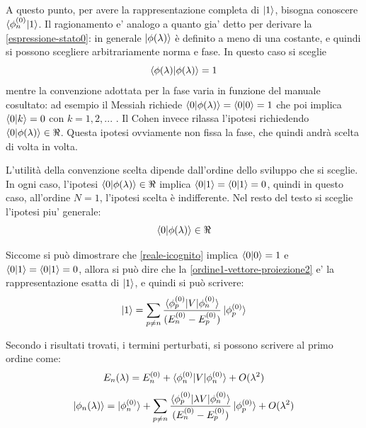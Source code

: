 \documentclass[a4paper, 10pt]{article}
\newcommand{\reff}[1]{\mbox{\ref{#1}}}
\begin{document}
A questo punto, per avere la rappresentazione completa di $\ket{1}$, bisogna conoscere $\braket{\phi_n^{(0)} | 1}$. Il ragionamento e' analogo a quanto gia' detto per derivare la \reff{espressione-stato0}: in generale $\ket{\phi(\lambda)}$ è definito a meno di una costante, e quindi si possono scegliere arbitrariamente norma e fase. In questo caso si sceglie
\begin{equation}
	\label{normalizzazione-incognito}
	\braket{\phi(\lambda) | \phi(\lambda)} = 1
\end{equation}
mentre la convenzione adottata per la fase varia in funzione del manuale cosultato: ad esempio il Messiah\cite{messiah} richiede $\braket{0 | \phi(\lambda)} = \braket{0 | 0} = 1$ che poi implica $\braket{0 | k} = 0$ con $k = 1, 2, ...$ . Il Cohen\cite{cohen} invece rilassa l'ipotesi richiedendo $\braket{0 | \phi(\lambda)} \in \Re$. Questa ipotesi ovviamente non fissa la fase, che quindi andrà scelta di volta in volta.

L'utilità della convenzione scelta dipende dall'ordine dello sviluppo che si sceglie. In ogni caso, l'ipotesi $\braket{0 | \phi(\lambda)} \in \Re$ implica $\braket{0 | 1} = \braket{0 | 1} = 0$, quindi in questo caso, all'ordine $N=1$, l'ipotesi scelta è indifferente. Nel resto del testo si sceglie l'ipotesi piu' generale:
\begin{equation}
	\label{reale-icognito}
	\braket{0 | \phi(\lambda)} \in \Re
\end{equation}

Siccome si può dimostrare che \reff{reale-icognito} implica $\braket{0 | 0} = 1$ e $\braket{0 | 1} = \braket{0 | 1} = 0$, allora si può dire che la \reff{ordine1-vettore-proiezione2} e' la rappresentazione esatta di $\ket{1}$, e quindi si può scrivere:
\begin{equation}
	\label{stato1}
	\ket{1} = \sum_{p \ne n} \frac{\braket{\phi_p^{(0)} | V | \phi_n^{(0)}}}{(E_n^{(0)} - E_p^{(0)}) } \ket{\phi_{p}^{(0)}}
\end{equation}

Secondo i risultati trovati, i termini perturbati, si possono scrivere al primo ordine come:
\begin{equation}
	\label{soluzione1-energia}
	E_n(\lambda) = E_n^{(0)} + \braket{\phi_n^{(0)}|V|\phi_n^{(0)}} + O(\lambda^2)
\end{equation}
\begin{equation}
\label{soluzione1-stato}
\ket{\phi_n(\lambda)} = \ket{\phi_n^{(0)}} + \sum_{p \ne n} \frac{\braket{\phi_p^{(0)} | \lambda V | \phi_n^{(0)}}}{(E_n^{(0)} - E_p^{(0)}) } \ket{\phi_{p}^{(0)}} + O(\lambda^2)
\end{equation}
\end{document}
